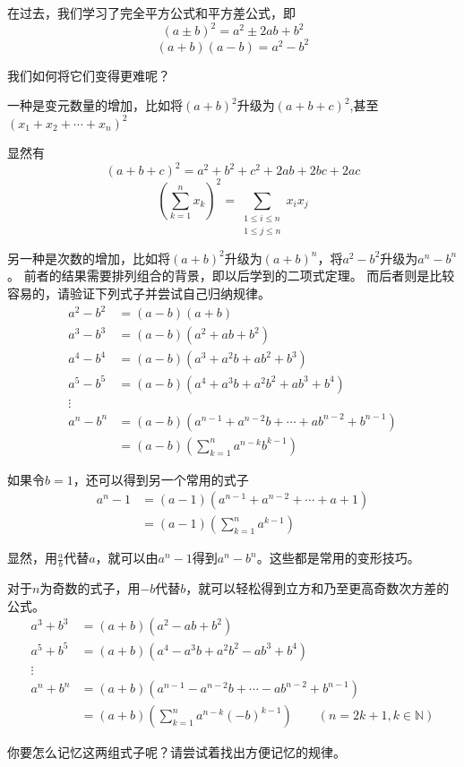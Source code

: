 在过去，我们学习了完全平方公式和平方差公式，即
\[(a\pm b)^2=a^2\pm 2ab +b^2\]
\[(a+b)(a-b)=a^2-b^2\]

我们如何将它们变得更难呢？

一种是变元数量的增加，比如将$(a+b)^2$升级为$(a+b+c)^2$,甚至$(x_1+x_2+\cdots +x_n)^2$

显然有\[(a+b+c)^2=a^2+b^2+c^2+2ab+2bc+2ac\]
\[(\sum_{k= 1}^{n}x_k  )^2=\sum_{\substack{1\leq i\leq n\\1\leq j\leq n}}x_ix_j\]

另一种是次数的增加，比如将$(a+b)^2$升级为$(a+b)^n$，将$a^2-b^2$升级为$a^n-b^n$。
前者的结果需要排列组合的背景，即以后学到的二项式定理。
而后者则是比较容易的，请验证下列式子并尝试自己归纳规律。
\begin{align*}
    a^2-b^2&=(a-b)(a+b)\\
    a^3-b^3&=(a-b)(a^2+ab+b^2)\\
    a^4-b^4&=(a-b)(a^3+a^2b+ab^2+b^3)\\
    a^5-b^5&=(a-b)(a^4+a^3b+a^2b^2+ab^3+b^4)\\
    \vdots  \\
    a^n-b^n&=(a-b)(a^{n-1}+a^{n-2}b+\cdots +ab^{n-2}+b^{n-1})\\
           &=(a-b)(\sum_{k=1}^{n}a^{n-k}b^{k-1})
\end{align*}

如果令$b=1$，还可以得到另一个常用的式子
\begin{align*}
     a^n-1&=(a-1)(a^{n-1}+a^{n-2}+\cdots +a+1)\\
           &=(a-1)(\sum_{k=1}^{n}a^{k-1})
\end{align*}
     
显然，用$\frac{a}{b}$代替$a$，就可以由$a^n-1$得到$a^n-b^n$。这些都是常用的变形技巧。

对于$n$为奇数的式子，用$-b$代替$b$，就可以轻松得到立方和乃至更高奇数次方差的公式。
\begin{align*}
a^3+b^3&=(a+b)(a^2-ab+b^2)\\
a^5+b^5&=(a+b)(a^4-a^3b+a^2b^2-ab^3+b^4)\\
\vdots \\
a^n+b^n&=(a+b)(a^{n-1}-a^{n-2}b+\cdots -ab^{n-2}+b^{n-1})\\
       &=(a+b)(\sum_{k=1}^{n}a^{n-k}(-b)^{k-1})\qquad(n=2k+1,k\in \mathbb{N} )
\end{align*}

你要怎么记忆这两组式子呢？请尝试着找出方便记忆的规律。

